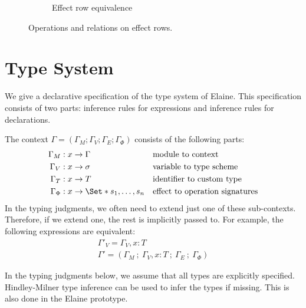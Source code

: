 \begin{figure}[htbp]
\begin{subfigure}{\textwidth}
    \caption{Effect row equivalence}
    \label{fig:rowequiv}
\end{subfigure}
\caption{Operations and relations on effect rows.}
\end{figure}

\section{Type System}

We give a declarative specification of the type system of Elaine. This specification consists of two parts: inference rules for expressions and inference rules for declarations.

The context $\Gamma = (\Gamma_M; \Gamma_V; \Gamma_E; \Gamma_\Phi)$ consists of the following parts:
\begin{align*}
    \Gamma_M &: x \to \Gamma&& \text{module to context}\\
    \Gamma_V &: x \to \sigma && \text{variable to type scheme}\\
    \Gamma_T &: x \to T && \text{identifier to custom type}\\
    \Gamma_\Phi &: x \to \S{s_1,\dots,s_n} && \text{effect to operation signatures}
\end{align*}
In the typing judgments, we often need to extend just one of these sub-contexts. Therefore, if we extend one, the rest is implicitly passed to. For example, the following expressions are equivalent:
\begin{gather*}
    \Gamma'_V = \Gamma_V, x: T \\
    \Gamma' = (\Gamma_M\ ;\ \Gamma_V, x: T\ ;\ \Gamma_E\ ;\ \Gamma_\Phi)
\end{gather*}

In the typing judgments below, we assume that all types are explicitly specified. Hindley-Milner type inference can be used to infer the types if missing. This is also done in the Elaine prototype.

